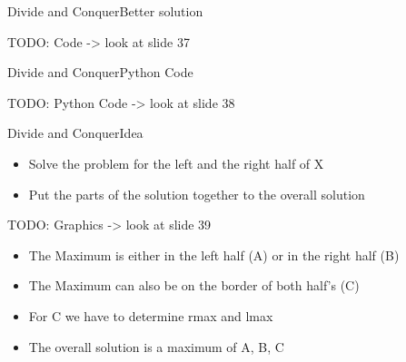 
\begin{frame}{Divide and Conquer}{Better solution}
  
  TODO: Code -> look at slide 37 \vspace{2em}
  
\end{frame}


\begin{frame}{Divide and Conquer}{Python Code}
  
  TODO: Python Code -> look at slide 38 \vspace{2em}
  
\end{frame}


\begin{frame}{Divide and Conquer}{Idea}
  \begin{itemize}
    \item
    Solve the problem for the left and the right half of X
    \item
      Put the parts of the solution together to the overall solution
  \end{itemize}
  
  TODO: Graphics -> look at slide 39 \vspace{2em}
  
  \begin{itemize}
    \item
      The Maximum is either in the left half (A) or in the right half (B)
    \item
      The Maximum can also be on the border of both half's (C) 
    \item
      For C we have to determine rmax and lmax
    \item
      The overall solution is a maximum of A, B, C
  \end{itemize}
\end{frame}


